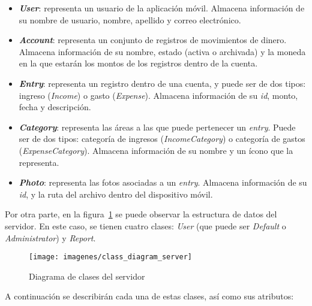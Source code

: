 \begin{itemize}
  \item \textbf{\textit{User}}: representa un usuario de la aplicación móvil. Almacena información de su nombre de usuario, nombre, apellido y correo electrónico.
	\item \textbf{\textit{Account}}: representa un conjunto de registros de movimientos de dinero. Almacena información de su nombre, estado (activa o archivada) y la moneda en la que estarán los montos de los registros dentro de la cuenta.
	\item \textbf{\textit{Entry}}: representa un registro dentro de una cuenta, y puede ser de dos tipos: ingreso (\textit{Income}) o gasto (\textit{Expense}). Almacena información de su \textit{id}, monto, fecha y descripción.
	\item \textbf{\textit{Category}}: representa las áreas a las que puede pertenecer un \textit{entry}. Puede ser de dos tipos: categoría de ingresos (\textit{IncomeCategory}) o categoría de gastos (\textit{ExpenseCategory}). Almacena información de su nombre y un ícono que la representa.
	\item \textbf{\textit{Photo}}: representa las fotos asociadas a un \textit{entry}. Almacena información de su \textit{id}, y la ruta del archivo dentro del dispositivo móvil.
\end{itemize}

Por otra parte, en la figura~\ref{fig:diagramaClasesServidor} se puede observar la estructura de datos del servidor. En este caso, se tienen cuatro clases: \textit{User} (que puede ser \textit{Default} o \textit{Administrator}) y \textit{Report}.

\begin{figure}[ht]
  \centering
  \texttt{[image: imagenes/class\_diagram\_server]}
  \caption{Diagrama de clases del servidor}
  \label{fig:diagramaClasesServidor}
\end{figure}

A continuación se describirán cada una de estas clases, así como sus atributos:

